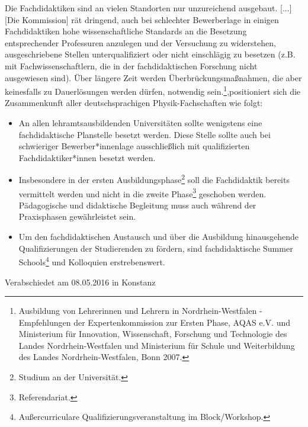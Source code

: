 \documentclass[DIV=calc]{scrartcl}
\begin{document}
\glqq Die Fachdidaktiken sind an vielen Standorten nur unzureichend ausgebaut. [...] [Die Kommission] rät dringend, auch bei schlechter Bewerberlage in einigen Fachdidaktiken hohe wissenschaftliche Standards an die Besetzung entsprechender Professuren anzulegen und der Versuchung zu widerstehen, ausgeschriebene Stellen unterqualifiziert oder nicht einschlägig zu besetzen (z.B. mit Fachwissenschaftlern, die in der fachdidaktischen Forschung nicht ausgewiesen sind). Über längere Zeit werden Überbrückungsmaßnahmen, die aber keinesfalls zu Dauerlösungen werden dürfen, notwendig sein.\grqq\footnote{Ausbildung von Lehrerinnen und Lehrern in
Nordrhein-Westfalen - Empfehlungen der Expertenkommission zur Ersten Phase, AQAS e.V. und Ministerium für Innovation, Wissenschaft, Forschung und Technologie des Landes Nordrhein-Westfalen und Ministerium für Schule und Weiterbildung des Landes Nordrhein-Westfalen, Bonn 2007.},positioniert sich die Zusammenkunft aller deutschsprachigen Physik-Fachschaften wie folgt:
\begin{itemize}
\item An allen lehramtsausbildenden Universitäten sollte wenigstens eine fachdidaktische Planstelle besetzt werden. Diese Stelle sollte auch bei schwieriger Bewerber*innenlage ausschließlich mit qualifizierten Fachdidaktiker*innen besetzt werden.
\item Insbesondere in der ersten Ausbildungsphase\footnote{Studium an der Universität.} soll die Fachdidaktik bereits vermittelt werden und nicht in die zweite Phase\footnote{Referendariat.} geschoben werden. Pädagogische und didaktische Begleitung muss auch während der Praxisphasen gewährleistet sein.
\item Um den fachdidaktischen Austausch und über die Ausbildung hinausgehende Qualifizierungen der Studierenden zu fördern, sind fachdidaktische Summer Schools\footnote{Außercurriculare Qualifizierungsveranstaltung im Block/Workshop.} und Kolloquien erstrebenswert.
\end{itemize}

\vfill
\begin{flushright}
Verabschiedet am 08.05.2016 in Konstanz
\end{flushright}
\end{document}
